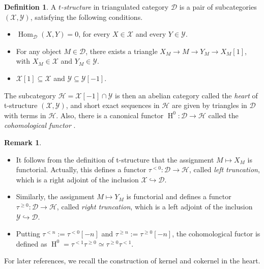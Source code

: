 \documentclass[12pt]{amsart}
\numberwithin{equation}{section}
\theoremstyle{definition}
\newtheorem{remark}[lemma]{Remark}
\newtheorem{definition}[lemma]{Definition}
\DeclareMathOperator{\Hom}{Hom}
\DeclareMathOperator{\HH}{H}
\newtheorem*{theorem 0*}{Theorem}
\newtheorem*{theorem a*}{Theorem A}
\newtheorem*{theorem b*}{Theorem B}
\numberwithin{diagram}{section}
\begin{document}
\begin{definition}
A {\it $t$-structure} in triangulated category $\mathcal{D}$ is a pair of subcategories $(\mathcal{X},\mathcal{Y})$, satisfying the following conditions.
	\begin{itemize}
	\item[(1)] $\Hom_{\mathcal{D}}(X,Y)=0$, for every $X\in\mathcal{X}$ and every $Y\in\mathcal{Y}$.
	\item[(2)] For any object $M\in \mathcal{D}$, there exists a triangle $X_M\rightarrow M\rightarrow Y_M\rightarrow X_M[1]$, with $X_M\in \mathcal{X}$ and $Y_M\in \mathcal{Y}$.
	\item[(3)] $\mathcal{X}[1]\subseteq \mathcal{X}$ and $\mathcal{Y}\subseteq\mathcal{Y}[-1]$.
	\end{itemize}
The subcategory $\mathcal{H}=\mathcal{X}[-1]\cap\mathcal{Y}$ is then an abelian category called the {\it heart} of t-structure $(\mathcal{X},\mathcal{Y})$, and short exact sequences in $\mathcal{H}$ are given by triangles in $\mathcal{D}$ with terms in $\mathcal{H}$. Also, there is a canonical functor $\HH^0:\mathcal{D}\rightarrow \mathcal{H}$ called the {\it cohomological functor} \cite{BBD}.
	\end{definition}
\begin{remark}\label{2.15}
\begin{itemize}
\item[(1)]
It follows from the definition of t-structure that the assignment $M\mapsto X_M$ is functorial. Actually, this defines a functor $\tau^{< 0}:\mathcal{D}\rightarrow \mathcal{H}$, called {\it left truncation}, which is a right adjoint of the inclusion $\mathcal{X}\hookrightarrow \mathcal{D}$.
\item[(2)]
Similarly, the assignment $M\mapsto Y_M$ is functorial and defines a functor $\tau^{\geq 0}:\mathcal{D}\rightarrow \mathcal{H}$, called {\it right truncation}, which is a left adjoint of the inclusion $\mathcal{Y}\hookrightarrow \mathcal{D}$.
\item[(3)]
Putting $\tau^{< n}:=\tau^{< 0}[-n]$ and $\tau^{\geq n}:=\tau^{\geq 0}[-n]$, the cohomological fuctor is defined as $\HH^0=\tau^{< 1}\tau^{\geq 0}\simeq\tau^{\geq 0}\tau^{< 1}$.
\end{itemize}
\end{remark}
For later references, we recall the construction of kernel and cokernel in the heart.
\end{document}
